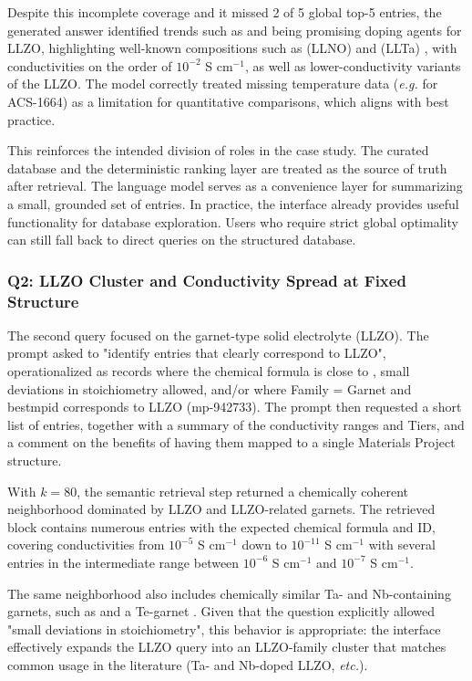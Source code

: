 \documentclass[a4paper,fleqn]{cas-sc}
\begin{document}
Despite this incomplete coverage and it missed 2 of 5 global top-5 entries, the generated answer identified trends such as  and  being promising doping agents for LLZO, highlighting well-known compositions such as  (LLNO) \cite{Zhao2018DenseMethod} and  (LLTa) \cite{Kotobuki2017ImprovementTa}, with conductivities on the order of $10^{-2}$ S cm$^{-1}$, as well as lower-conductivity variants of the LLZO. The model correctly treated missing temperature data (\textit{e.g.} for ACS-1664) as a limitation for quantitative comparisons, which aligns with best practice.

This reinforces the intended division of roles in the case study. The curated database and the deterministic ranking layer are treated as the source of truth after retrieval. The language model serves as a convenience layer for summarizing a small, grounded set of entries. In practice, the interface already provides useful functionality for database exploration. Users who require strict global optimality can still fall back to direct queries on the structured database.

\subsubsection{Q2: LLZO Cluster and Conductivity Spread at Fixed Structure}\label{sec:q2}
The second query focused on the garnet-type solid electrolyte  (LLZO). The prompt asked to "identify entries that clearly correspond to LLZO", operationalized as records where the chemical formula is close to , small deviations in stoichiometry allowed, and/or where Family = Garnet and best\textunderscore mpid corresponds to LLZO (mp-942733). The prompt then requested a short list of entries, together with a summary of the conductivity ranges and Tiers, and a comment on the benefits of having them mapped to a single Materials Project structure.

With $k = 80$, the semantic retrieval step returned a chemically coherent neighborhood dominated by LLZO and LLZO-related garnets. The retrieved block contains numerous entries with the expected chemical formula and ID, covering conductivities from $10^{-5}$ S cm$^{-1}$ down to $10^{-11}$ S cm$^{-1}$ with several entries in the intermediate range between $10^{-6}$ S cm$^{-1}$ and $10^{-7}$ S cm$^{-1}$.

The same neighborhood also includes chemically similar Ta- and Nb-containing garnets, such as  and a Te-garnet . Given that the question explicitly allowed "small deviations in stoichiometry", this behavior is appropriate: the interface effectively expands the LLZO query into an LLZO-family cluster that matches common usage in the literature (Ta- and Nb-doped LLZO, \textit{etc.}).
\end{document}
